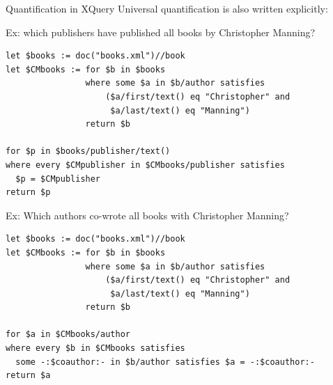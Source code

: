 \begin{frame}[fragile]{Quantification in XQuery}
\alert{Universal quantification} is also written explicitly:

Ex: which publishers have published all books by Christopher Manning?

\begin{lstlisting}[style=XQuery]
let $books := doc("books.xml")//book
let $CMbooks := for $b in $books
                where some $a in $b/author satisfies
                    ($a/first/text() eq "Christopher" and 
                     $a/last/text() eq "Manning")
                return $b

for $p in $books/publisher/text()
where every $CMpublisher in $CMbooks/publisher satisfies
  $p = $CMpublisher
return $p
\end{lstlisting}
\end{frame}

\begin{frame}[fragile]

Ex: Which authors co-wrote all books with Christopher Manning?

\begin{lstlisting}[style=XQuery]
let $books := doc("books.xml")//book
let $CMbooks := for $b in $books
                where some $a in $b/author satisfies
                    ($a/first/text() eq "Christopher" and 
                     $a/last/text() eq "Manning")
                return $b

for $a in $CMbooks/author
where every $b in $CMbooks satisfies
  some -:$coauthor:- in $b/author satisfies $a = -:$coauthor:-
return $a
\end{lstlisting}

\end{frame}

